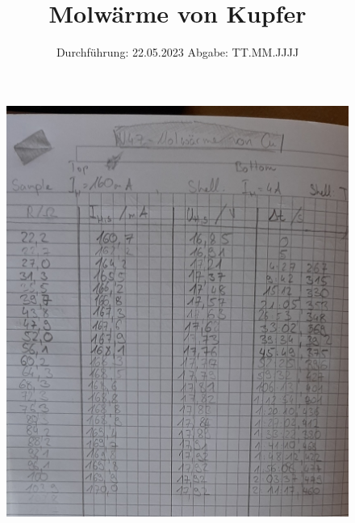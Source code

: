 

\subject{V47}
\title{Molwärme von Kupfer}
\date{%
  Durchführung: 22.05.2023
  \hspace{3em}
  Abgabe: TT.MM.JJJJ
}



\maketitle
\thispagestyle{empty}
\tableofcontents
\newpage
\setcounter{page}{1}







\printbibliography{}
\begin{figure}
  \centering
  \includegraphics[width=\textwidth]{Messdaten/Messdaten.pdf}
\end{figure}

